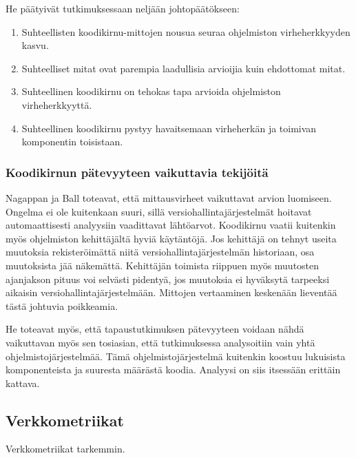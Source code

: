 \documentclass[finnish]{../tktltiki2}
\theoremstyle{definition}
\theoremstyle{remark}
\begin{document}
\noindent He päätyivät tutkimuksessaan neljään johtopäätökseen:

\begin{enumerate}

    \item Suhteellisten koodikirnu-mittojen nousua seuraa ohjelmiston virheherkkyyden kasvu.

    \item Suhteelliset mitat ovat parempia laadullisia arvioijia kuin ehdottomat mitat.

    \item Suhteellinen koodikirnu on tehokas tapa arvioida ohjelmiston virheherkkyyttä.

    \item Suhteellinen koodikirnu pystyy havaitsemaan virheherkän ja toimivan komponentin toisistaan.

\end{enumerate}

\subsubsection{Koodikirnun pätevyyteen vaikuttavia tekijöitä}

Nagappan ja Ball toteavat, että mittausvirheet vaikuttavat arvion luomiseen. Ongelma ei ole kuitenkaan suuri, sillä 
versiohallintajärjestelmät hoitavat automaattisesti analyysiin vaadittavat lähtöarvot. Koodikirnu vaatii kuitenkin myös 
ohjelmiston kehittäjältä hyviä käytäntöjä. Jos kehittäjä on tehnyt useita muutoksia rekisteröimättä niitä 
versiohallintajärjestelmän historiaan, osa muutoksista jää näkemättä. Kehittäjän toimista riippuen myös muutosten 
ajanjakson pituus voi selvästi pidentyä, jos muutoksia ei hyväksytä tarpeeksi aikaisin versiohallintajärjestelmään. 
Mittojen vertaaminen keskenään lieventää tästä johtuvia poikkeamia.

    He toteavat myös, että tapaustutkimuksen pätevyyteen voidaan nähdä vaikuttavan myös sen tosiasian, että 
tutkimuksessa analysoitiin vain yhtä ohjelmistojärjestelmää. Tämä ohjelmistojärjestelmä kuitenkin koostuu lukuisista 
komponenteista ja suuresta määrästä koodia. Analyysi on siis itsessään erittäin kattava.

\subsection{Verkkometriikat}

Verkkometriikat tarkemmin.
\end{document}
